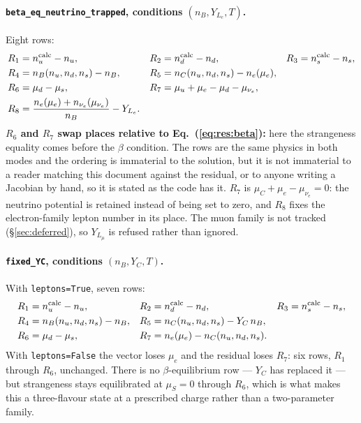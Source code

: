 \documentclass[aps,prc,onecolumn,superscriptaddress,nofootinbib,10pt]{revtex4-2}
\newcommand{\nB}{n_B}
\newcommand{\nC}{n_C}
\newcommand{\muC}{\mu_C}
\newcommand{\muS}{\mu_S}
\newcommand{\munue}{\mu_{\nu_e}}
\begin{document}
\paragraph{\texttt{beta\_eq\_neutrino\_trapped}, conditions
$(\nB, Y_{L_e}, T)$.} Eight rows:
%
\begin{align}
R_1 &= n_u^{\rm calc} - n_u , &
R_2 &= n_d^{\rm calc} - n_d , &
R_3 &= n_s^{\rm calc} - n_s , \notag \\
R_4 &= \nB(n_u,n_d,n_s) - \nB , &
R_5 &= \nC(n_u,n_d,n_s) - n_e(\mu_e) , \notag \\
R_6 &= \mu_d - \mu_s , &
R_7 &= \mu_u + \mu_e - \mu_d - \munue , \notag \\
R_8 &= \frac{n_e(\mu_e) + n_{\nu_e}(\munue)}{\nB} - Y_{L_e} . &&
\label{eq:res:trapped}
\end{align}
%
\textbf{$R_6$ and $R_7$ swap places relative to
Eq.~(\ref{eq:res:beta}):} here the strangeness equality comes before the
$\beta$ condition. The rows are the same physics in both modes and the
ordering is immaterial to the solution, but it is not immaterial to a reader
matching this document against the residual, or to anyone writing a Jacobian
by hand, so it is stated as the code has it. $R_7$ is $\muC + \mu_e -
\munue = 0$: the neutrino potential is retained instead of being set to zero,
and $R_8$ fixes the electron-family lepton number in its place. The muon
family is not tracked (\S\ref{sec:deferred}), so $Y_{L_\mu}$ is refused rather
than ignored.

\paragraph{\texttt{fixed\_YC}, conditions $(\nB, Y_C, T)$.} With
\texttt{leptons=True}, seven rows:
%
\begin{align}
R_1 &= n_u^{\rm calc} - n_u , &
R_2 &= n_d^{\rm calc} - n_d , &
R_3 &= n_s^{\rm calc} - n_s , \notag \\
R_4 &= \nB(n_u,n_d,n_s) - \nB , &
R_5 &= \nC(n_u,n_d,n_s) - Y_C\, \nB , \notag \\
R_6 &= \mu_d - \mu_s , &
R_7 &= n_e(\mu_e) - \nC(n_u,n_d,n_s) . &&
\label{eq:res:yc}
\end{align}
%
With \texttt{leptons=False} the vector loses $\mu_e$ and the residual loses
$R_7$: six rows, $R_1$ through $R_6$, unchanged. There is no
$\beta$-equilibrium row --- $Y_C$ has replaced it --- but strangeness stays
equilibrated at $\muS = 0$ through $R_6$, which is what makes this a
three-flavour state at a prescribed charge rather than a two-parameter family.
\end{document}
